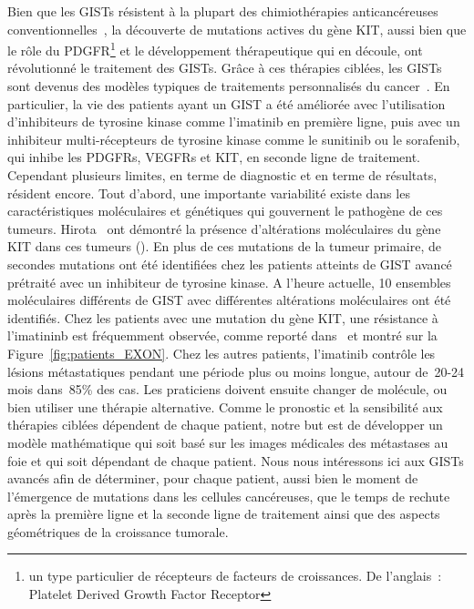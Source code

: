 \documentclass[main.tex]{subfiles}
\begin{document}
Bien que les GISTs résistent à la plupart des chimiothérapies anticancéreuses conventionnelles~\cite{demetri2011gastrointestinal}, 
la découverte de mutations actives du gène KIT, aussi bien que le rôle du PDGFR\footnote{un type particulier de récepteurs de facteurs de croissances. De l'anglais~: Platelet Derived Growth Factor Receptor} et le développement thérapeutique qui en découle, ont révolutionné le traitement des GISTs.
Grâce à ces thérapies ciblées, les GISTs sont devenus des modèles typiques de traitements personnalisés du cancer~\cite{Blay2012}. 
En particulier, la vie des patients ayant un GIST a été améliorée avec l'utilisation d'inhibiteurs de tyrosine kinase comme l'imatinib en première ligne, puis avec un inhibiteur multi-récepteurs de tyrosine kinase comme 
le sunitinib ou le sorafenib,  
qui inhibe les PDGFRs, VEGFRs et KIT, en seconde ligne de traitement. 
Cependant plusieurs limites, en terme de diagnostic et en terme de résultats, résident encore.
Tout d'abord, une importante variabilité existe dans les caractéristiques moléculaires et génétiques qui gouvernent le pathogène de ces tumeurs.
Hirota \etal\ ont démontré la présence d'altérations moléculaires du gène KIT dans ces tumeurs (\cf \cite{Hirota1998}). 
En plus de ces mutations de la tumeur primaire, de secondes mutations ont été identifiées chez les patients atteints de GIST avancé prétraité avec un inhibiteur de tyrosine kinase. A l'heure actuelle, 10 ensembles moléculaires différents de GIST avec différentes altérations moléculaires ont été identifiés. 
Chez les patients avec une mutation du gène KIT, une résistance à l'imatininb est fréquemment observée, comme reporté dans~\cite{Blay2011} et montré sur la Figure~\ref{fig:patients_EXON}. 
Chez les autres patients, l'imatinib contrôle les lésions métastatiques pendant une période plus ou moins longue, autour de~20-24 mois dans~85\% des cas. 
Les praticiens doivent ensuite changer de molécule, ou bien utiliser une thérapie alternative. 
Comme le pronostic et la sensibilité aux thérapies ciblées dépendent de chaque patient, notre but est de développer un modèle mathématique qui soit basé sur les images médicales des métastases au foie et qui soit dépendant de chaque patient. 
Nous nous intéressons ici aux GISTs avancés afin de déterminer, pour chaque patient, aussi bien le moment de l'émergence de mutations dans les cellules cancéreuses, que le temps de rechute après la première ligne et la seconde ligne de traitement ainsi que des aspects géométriques de la croissance tumorale.
\end{document}
